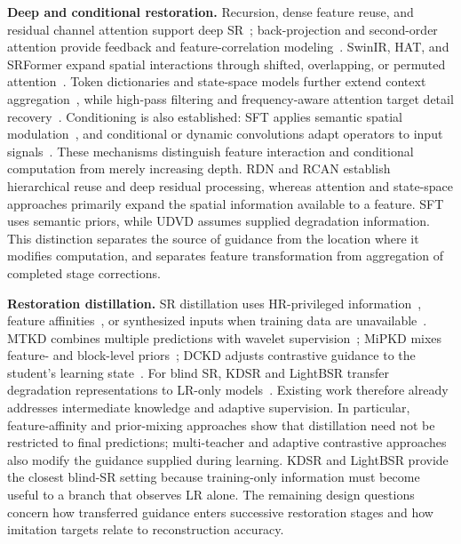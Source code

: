 \documentclass[10pt,journal,letterpaper]{IEEEtran}
\begin{document}
\noindent\textbf{Deep and conditional restoration.}
Recursion, dense feature reuse, and residual channel attention support deep SR~\cite{tai2017drrn,zhang2018rdn,zhang2018rcan}; back-projection and second-order attention provide feedback and feature-correlation modeling~\cite{haris2018dbpn,dai2019san}. SwinIR, HAT, and SRFormer expand spatial interactions through shifted, overlapping, or permuted attention~\cite{liang2021swinir,chen2023hat,zhou2023srformer}. Token dictionaries and state-space models further extend context aggregation~\cite{zhang2024atd,guo2024mambair,guo2025mambairv2}, while high-pass filtering and frequency-aware attention target detail recovery~\cite{magid2021dynamic,dai2024freqformer}. Conditioning is also established: SFT applies semantic spatial modulation~\cite{wang2018sft}, and conditional or dynamic convolutions adapt operators to input signals~\cite{yang2019condconv,chen2020dynamicconv,xu2020udvd}. These mechanisms distinguish feature interaction and conditional computation from merely increasing depth. RDN and RCAN establish hierarchical reuse and deep residual processing, whereas attention and state-space approaches primarily expand the spatial information available to a feature. SFT uses semantic priors, while UDVD assumes supplied degradation information. This distinction separates the source of guidance from the location where it modifies computation, and separates feature transformation from aggregation of completed stage corrections.

\noindent\textbf{Restoration distillation.}
SR distillation uses HR-privileged information~\cite{lee2020pisr}, feature affinities~\cite{he2020fakd}, or synthesized inputs when training data are unavailable~\cite{zhang2021dfkd}. MTKD combines multiple predictions with wavelet supervision~\cite{jiang2024mtkd}; MiPKD mixes feature- and block-level priors~\cite{li2025mipkd}; DCKD adjusts contrastive guidance to the student's learning state~\cite{zhou2025dckd}. For blind SR, KDSR and LightBSR transfer degradation representations to LR-only models~\cite{xia2023kdsr,yuan2025lightbsr}. Existing work therefore already addresses intermediate knowledge and adaptive supervision. In particular, feature-affinity and prior-mixing approaches show that distillation need not be restricted to final predictions; multi-teacher and adaptive contrastive approaches also modify the guidance supplied during learning. KDSR and LightBSR provide the closest blind-SR setting because training-only information must become useful to a branch that observes LR alone. The remaining design questions concern how transferred guidance enters successive restoration stages and how imitation targets relate to reconstruction accuracy.
\end{document}
